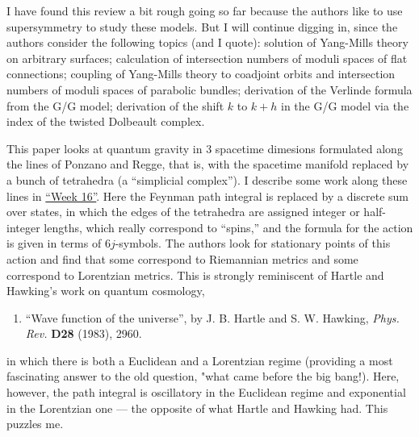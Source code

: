 \documentclass{article}
\def\tightlist{}
\renewcommand{\texttt}[1]{%
  \begingroup
  \ttfamily
  \begingroup\lccode`~=`/\lowercase{\endgroup\def~}{/\discretionary{}{}{}}%
  \begingroup\lccode`~=`[\lowercase{\endgroup\def~}{[\discretionary{}{}{}}%
  \begingroup\lccode`~=`.\lowercase{\endgroup\def~}{.\discretionary{}{}{}}%
  \catcode`/=\active\catcode`[=\active\catcode`.=\active
  \scantokens{#1\noexpand}%
  \endgroup
}
\begin{document}
I have found this review a bit rough going so far because the authors
like to use supersymmetry to study these models. But I will continue
digging in, since the authors consider the following topics (and I
quote): solution of Yang-Mills theory on arbitrary surfaces; calculation
of intersection numbers of moduli spaces of flat connections; coupling
of Yang-Mills theory to coadjoint orbits and intersection numbers of
moduli spaces of parabolic bundles; derivation of the Verlinde formula
from the G/G model; derivation of the shift \(k\) to \(k+h\) in the G/G
model via the index of the twisted Dolbeault complex.


This paper looks at quantum gravity in 3 spacetime dimesions formulated
along the lines of Ponzano and Regge, that is, with the spacetime
manifold replaced by a bunch of tetrahedra (a ``simplicial complex''). I
describe some work along these lines in
\protect\hyperlink{week16}{``Week 16''}. Here the Feynman path integral
is replaced by a discrete sum over states, in which the edges of the
tetrahedra are assigned integer or half-integer lengths, which really
correspond to ``spins,'' and the formula for the action is given in
terms of \(6j\)-symbols. The authors look for stationary points of this
action and find that some correspond to Riemannian metrics and some
correspond to Lorentzian metrics. This is strongly reminiscent of Hartle
and Hawking's work on quantum cosmology,

\begin{enumerate}
\def\labelenumi{\arabic{enumi})}
\setcounter{enumi}{3}
\tightlist
\item
  ``Wave function of the universe'', by J. B. Hartle and S. W. Hawking,
  \emph{Phys. Rev.} \textbf{D28} (1983), 2960.
\end{enumerate}

in which there is both a Euclidean and a Lorentzian regime (providing a
most fascinating answer to the old question, "what came before the big
bang!). Here, however, the path integral is oscillatory in the Euclidean
regime and exponential in the Lorentzian one --- the opposite of what
Hartle and Hawking had. This puzzles me.
\end{document}
